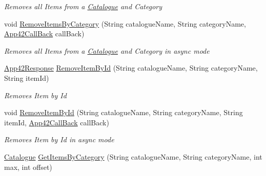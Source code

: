 \begin{DoxyCompactItemize}
\begin{DoxyCompactList}\small\item\em Removes all Items from a \hyperlink{classcom_1_1shephertz_1_1app42_1_1paas_1_1sdk_1_1csharp_1_1shopping_1_1_catalogue}{Catalogue} and Category \end{DoxyCompactList}\item 
void \hyperlink{classcom_1_1shephertz_1_1app42_1_1paas_1_1sdk_1_1csharp_1_1shopping_1_1_catalogue_service_a95aa43891aa2b1733eb5413f6d69a825}{Remove\+Items\+By\+Category} (String catalogue\+Name, String category\+Name, \hyperlink{interfacecom_1_1shephertz_1_1app42_1_1paas_1_1sdk_1_1csharp_1_1_app42_call_back}{App42\+Call\+Back} call\+Back)
\begin{DoxyCompactList}\small\item\em Removes all Items from a \hyperlink{classcom_1_1shephertz_1_1app42_1_1paas_1_1sdk_1_1csharp_1_1shopping_1_1_catalogue}{Catalogue} and Category in async mode \end{DoxyCompactList}\item 
\hyperlink{classcom_1_1shephertz_1_1app42_1_1paas_1_1sdk_1_1csharp_1_1_app42_response}{App42\+Response} \hyperlink{classcom_1_1shephertz_1_1app42_1_1paas_1_1sdk_1_1csharp_1_1shopping_1_1_catalogue_service_a31319057885e2574ee5cef9ce154e449}{Remove\+Item\+By\+Id} (String catalogue\+Name, String category\+Name, String item\+Id)
\begin{DoxyCompactList}\small\item\em Removes Item by Id \end{DoxyCompactList}\item 
void \hyperlink{classcom_1_1shephertz_1_1app42_1_1paas_1_1sdk_1_1csharp_1_1shopping_1_1_catalogue_service_ab9a15ff027c44a4abc66fdd1d748c779}{Remove\+Item\+By\+Id} (String catalogue\+Name, String category\+Name, String item\+Id, \hyperlink{interfacecom_1_1shephertz_1_1app42_1_1paas_1_1sdk_1_1csharp_1_1_app42_call_back}{App42\+Call\+Back} call\+Back)
\begin{DoxyCompactList}\small\item\em Removes Item by Id in async mode \end{DoxyCompactList}\item 
\hyperlink{classcom_1_1shephertz_1_1app42_1_1paas_1_1sdk_1_1csharp_1_1shopping_1_1_catalogue}{Catalogue} \hyperlink{classcom_1_1shephertz_1_1app42_1_1paas_1_1sdk_1_1csharp_1_1shopping_1_1_catalogue_service_ad0407e92fbef478989d4daca770f2cee}{Get\+Items\+By\+Category} (String catalogue\+Name, String category\+Name, int max, int offset)

\end{DoxyCompactItemize}
